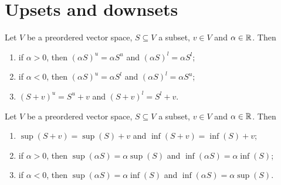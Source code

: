 \section{Upsets and downsets}
\begin{lemma} \label{sumMultipleUpDownsets}
Let $V$ be a preordered vector space, $S\subseteq V$ a subset, $v\in V$ and $\alpha\in \mathbb{R}$. Then
\begin{enumerate}
\item if $\alpha > 0$, then $(\alpha S)^u = \alpha S^u$ and $(\alpha S)^l = \alpha S^l$;
\item if $\alpha < 0$, then $(\alpha S)^u = \alpha S^l$ and $(\alpha S)^l = \alpha S^u$;
\item $(S+v)^u = S^u + v$ and $(S+v)^l = S^l + v$.
\end{enumerate}
\end{lemma}
\begin{corollary} \label{vectorSpaceOperationsOrderHomomorphisms}
Let $V$ be a preordered vector space, $S\subseteq V$ a subset, $v\in V$ and $\alpha\in \mathbb{R}$. Then
\begin{enumerate}
\item $\sup(S+v) = \sup(S)+v$ and $\inf(S+v) = \inf(S)+v$;
\item if $\alpha > 0$, then $\sup(\alpha S) = \alpha \sup(S)$ and $\inf(\alpha S) = \alpha \inf(S)$;
\item if $\alpha < 0$, then $\sup(\alpha S) = \alpha \inf(S)$ and $\inf(\alpha S) = \alpha \sup(S)$.
\end{enumerate}
\end{corollary}

